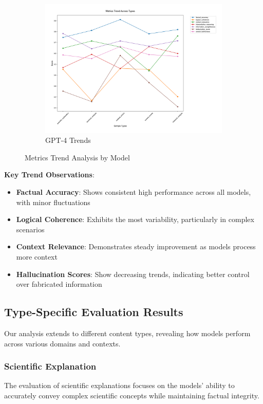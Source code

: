 \begin{figure}[!htbp]
\begin{subfigure}{0.3\textwidth}
    \includegraphics[width=\textwidth]{figures/overall/metrics_trend_gpt-4.png}
    \caption{GPT-4 Trends}
    \label{fig:metrics_trend_gpt4}
\end{subfigure}
\caption{Metrics Trend Analysis by Model}
\label{fig:metrics_trends}
\end{figure}

\textbf{Key Trend Observations}:
\begin{itemize}
    \item \textbf{Factual Accuracy}: Shows consistent high performance across all models, with minor fluctuations
    \item \textbf{Logical Coherence}: Exhibits the most variability, particularly in complex scenarios
    \item \textbf{Context Relevance}: Demonstrates steady improvement as models process more context
    \item \textbf{Hallucination Scores}: Show decreasing trends, indicating better control over fabricated information
\end{itemize}

\subsection{Type-Specific Evaluation Results}
Our analysis extends to different content types, revealing how models perform across various domains and contexts.

\subsubsection{Scientific Explanation}
The evaluation of scientific explanations focuses on the models' ability to accurately convey complex scientific concepts while maintaining factual integrity.

